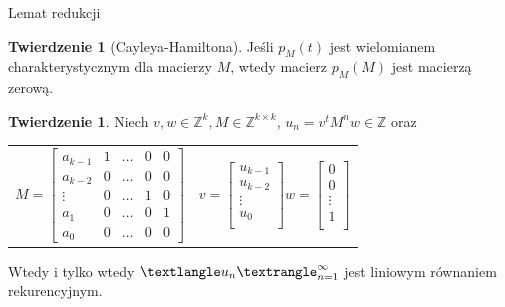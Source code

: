 \documentclass[handout]{beamer}
\def\Z{\mathbb Z}
\theoremstyle{definition}
\newtheorem*{twierdzenie}{Twierdzenie}
\theoremstyle{named}
\newtheorem*{namedtheorem}{Twierdzenie}
\begin{document}
\begin{frame}{Lemat redukcji}

\begin{namedtheorem}[Cayleya-Hamiltona]
    Jeśli $p_{M}(t)$ jest wielomianem charakterystycznym dla macierzy $M$, wtedy macierz $p_{M}(M)$ jest macierzą zerową. 
\end{namedtheorem}

\pause
\begin{twierdzenie}

    Niech $v, w \in \Z^{k}, M \in \Z^{k\times k}$, \pause $u_n = v^{t}M^{n}w \in \Z$ oraz
    \begin{table}[]
        \centering
        \begin{tabular}{c c}
    $
        M = \begin{bmatrix}
        a_{k-1} & 1 & \ldots & 0 & 0 \\
        a_{k-2} & 0 & \ldots & 0 & 0 \\
        \vdots & 0 & \ldots & 1 & 0 \\ 
        a_1 & 0 & \ldots & 0 & 1 \\
        a_0 & 0 & \ldots & 0 & 0
        \end{bmatrix}
    $
             &  
                $v= \begin{bmatrix}
                u_{k-1} \\ u_{k-2} \\ \vdots \\ u_{0} \\
                \end{bmatrix}
                w =  \begin{bmatrix}
                0 \\ 0 \\ \vdots \\ 1 \\
                \end{bmatrix}
                $
             & 
        \end{tabular}

    \end{table}
    \pause
    Wtedy i tylko wtedy $\textlangle u_n \textrangle_{n=1}^{\infty}$ jest liniowym równaniem rekurencyjnym. 

\end{twierdzenie}

\end{frame}
\end{document}
